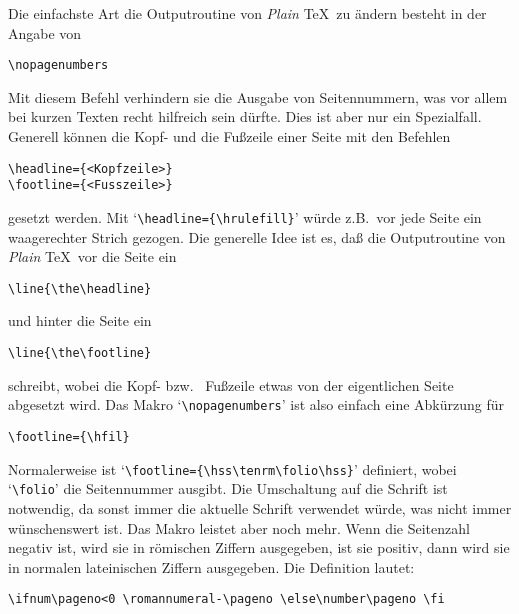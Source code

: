 Die einfachste Art die Outputroutine von {\em Plain} \TeX\ zu \"andern besteht
in der Angabe von
\begin{verbatim}
\nopagenumbers
\end{verbatim}
Mit diesem Befehl verhindern sie die 
Ausgabe von Seitennummern, was
vor allem bei kurzen Texten recht hilfreich sein d\"urfte. Dies ist aber
nur ein Spezialfall. Generell k\"onnen die Kopf- und die
Fu\ss{}zeile einer
Seite mit den Befehlen
\begin{verbatim}
\headline={<Kopfzeile>}
\footline={<Fusszeile>}
\end{verbatim}
gesetzt werden. Mit 
`\verb|\headline={\hrulefill}|' w\"urde z.B.\ vor
jede Seite ein waagerechter Strich gezogen. Die generelle Idee ist es,
da\ss{} die Outputroutine von {\em Plain} \TeX\ vor die Seite ein
\begin{verbatim}
\line{\the\headline}
\end{verbatim}
und hinter die Seite ein
\begin{verbatim}
\line{\the\footline}
\end{verbatim}
schreibt, wobei die Kopf- bzw.\ 
Fu\ss{}zeile etwas von der eigentlichen
Seite abgesetzt wird. Das Makro 
`\verb|\nopagenumbers|' ist also
einfach eine Abk\"urzung f\"ur
\begin{verbatim}
\footline={\hfil}
\end{verbatim}
Normalerweise ist
`\verb|\footline={\hss\tenrm\folio\hss}|' definiert,
wobei `\verb|\folio|' die 
Seitennummer ausgibt. Die Umschaltung auf
die 
Schrift ist notwendig, da sonst immer die aktuelle Schrift
verwendet w\"urde, was nicht immer w\"unschenswert ist. Das Makro leistet
aber noch mehr. Wenn die 
Seitenzahl negativ ist, wird sie in r\"omischen
Ziffern ausgegeben, ist sie positiv, dann wird sie in normalen
lateinischen Ziffern ausgegeben. Die Definition lautet:
\begin{verbatim}
\ifnum\pageno<0 \romannumeral-\pageno \else\number\pageno \fi
\end{verbatim}

